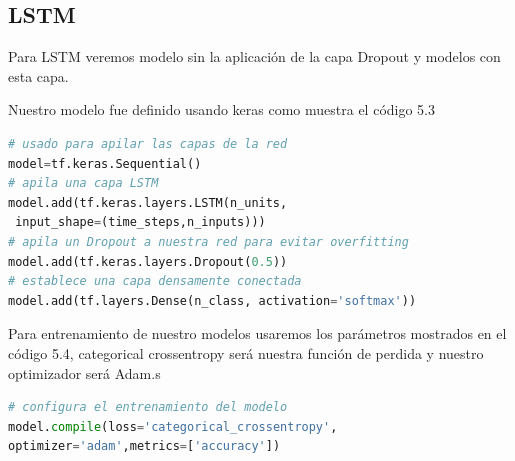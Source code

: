 \subsection{LSTM}
Para LSTM veremos modelo sin la aplicación de la capa Dropout y modelos con esta capa.


Nuestro modelo fue definido usando keras como muestra el código 5.3 

\begin{center}
\begin{lstlisting}[language=Python,caption=Modelo LSTM,captionpos=b,xleftmargin=.05\textwidth]
# usado para apilar las capas de la red
model=tf.keras.Sequential()
# apila una capa LSTM
model.add(tf.keras.layers.LSTM(n_units,
 input_shape=(time_steps,n_inputs)))
# apila un Dropout a nuestra red para evitar overfitting
model.add(tf.keras.layers.Dropout(0.5))
# establece una capa densamente conectada
model.add(tf.layers.Dense(n_class, activation='softmax'))


\end{lstlisting}
\end{center}



Para entrenamiento de nuestro modelos usaremos los parámetros mostrados en el código 5.4, categorical crossentropy será nuestra función de perdida y nuestro optimizador será Adam.s

\begin{lstlisting}[language=Python,caption=Parámetros para el entrenamiento del modelo,captionpos=b,xleftmargin=.05\textwidth]
# configura el entrenamiento del modelo
model.compile(loss='categorical_crossentropy',
optimizer='adam',metrics=['accuracy'])
\end{lstlisting}